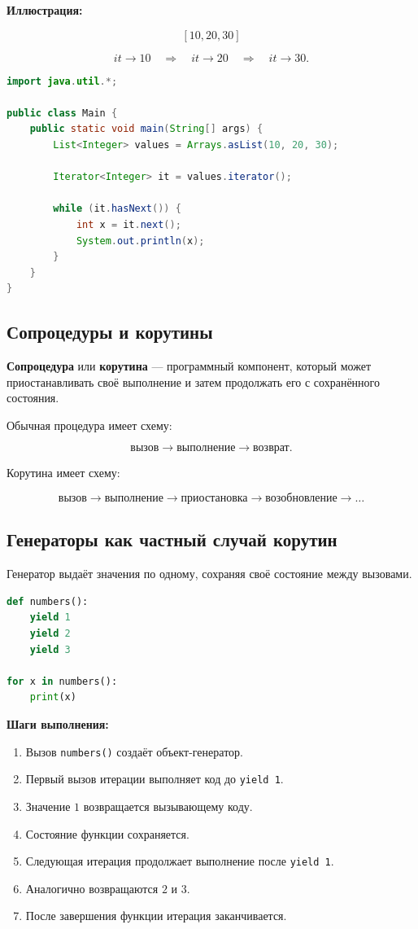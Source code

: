\documentclass[12pt,a4paper]{article}
\begin{document}
\textbf{Иллюстрация:}

\[
[10, 20, 30]
\]

\[
it \rightarrow 10 \quad \Rightarrow \quad it \rightarrow 20 \quad \Rightarrow \quad it \rightarrow 30.
\]

\begin{lstlisting}[language=Java,caption={Обход с помощью итератора}]
import java.util.*;

public class Main {
    public static void main(String[] args) {
        List<Integer> values = Arrays.asList(10, 20, 30);

        Iterator<Integer> it = values.iterator();

        while (it.hasNext()) {
            int x = it.next();
            System.out.println(x);
        }
    }
}
\end{lstlisting}

\subsection{Сопроцедуры и корутины}

\textbf{Сопроцедура} или \textbf{корутина} --- программный компонент, который может приостанавливать своё выполнение и затем продолжать его с сохранённого состояния.

Обычная процедура имеет схему:

\[
\text{вызов} \rightarrow \text{выполнение} \rightarrow \text{возврат}.
\]

Корутина имеет схему:

\[
\text{вызов} \rightarrow \text{выполнение} \rightarrow \text{приостановка} \rightarrow \text{возобновление} \rightarrow \dots
\]

\subsection{Генераторы как частный случай корутин}

Генератор выдаёт значения по одному, сохраняя своё состояние между вызовами.

\begin{lstlisting}[language=Python,caption={Генератор как пример корутины}]
def numbers():
    yield 1
    yield 2
    yield 3

for x in numbers():
    print(x)
\end{lstlisting}

\textbf{Шаги выполнения:}
\begin{enumerate}
    \item Вызов \texttt{numbers()} создаёт объект-генератор.
    \item Первый вызов итерации выполняет код до \texttt{yield 1}.
    \item Значение $1$ возвращается вызывающему коду.
    \item Состояние функции сохраняется.
    \item Следующая итерация продолжает выполнение после \texttt{yield 1}.
    \item Аналогично возвращаются $2$ и $3$.
    \item После завершения функции итерация заканчивается.
\end{enumerate}
\end{document}
